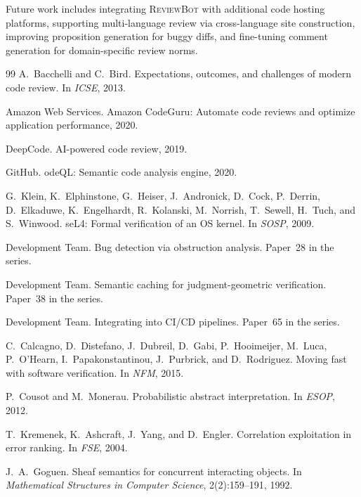 \documentclass[11pt]{article}
\newcommand{\ReviewBot}{\textsc{ReviewBot}}
\begin{document}
Future work includes integrating \ReviewBot{} with additional code hosting
platforms, supporting multi-language review via cross-language site
construction, improving proposition generation for buggy diffs, and
fine-tuning comment generation for domain-specific review norms.


\begin{thebibliography}{99}
A.~Bacchelli and C.~Bird.
\newblock Expectations, outcomes, and challenges of modern code review.
\newblock In \emph{ICSE}, 2013.

Amazon Web Services.
\newblock Amazon {C}ode{G}uru: Automate code reviews and optimize application
performance, 2020.

DeepCode.
\newblock AI-powered code review, 2019.

GitHub.
ode{QL}: Semantic code analysis engine, 2020.

G.~Klein, K.~Elphinstone, G.~Heiser, J.~Andronick, D.~Cock, P.~Derrin,
D.~Elkaduwe, K.~Engelhardt, R.~Kolanski, M.~Norrish, T.~Sewell, H.~Tuch,
and S.~Winwood.
\newblock se{L}4: Formal verification of an {OS} kernel.
\newblock In \emph{SOSP}, 2009.

\JuGeo{} Development Team.
\newblock Bug detection via obstruction analysis.
\newblock Paper~28 in the \JuGeo{} series.

\JuGeo{} Development Team.
\newblock Semantic caching for judgment-geometric verification.
\newblock Paper~38 in the \JuGeo{} series.

\JuGeo{} Development Team.
\newblock Integrating \JuGeo{} into CI/CD pipelines.
\newblock Paper~65 in the \JuGeo{} series.

C.~Calcagno, D.~Distefano, J.~Dubreil, D.~Gabi, P.~Hooimeijer,
M.~Luca, P.~O'Hearn, I.~Papakonstantinou, J.~Purbrick, and D.~Rodriguez.
\newblock Moving fast with software verification.
\newblock In \emph{NFM}, 2015.

P.~Cousot and M.~Monerau.
\newblock Probabilistic abstract interpretation.
\newblock In \emph{ESOP}, 2012.

T.~Kremenek, K.~Ashcraft, J.~Yang, and D.~Engler.
\newblock Correlation exploitation in error ranking.
\newblock In \emph{FSE}, 2004.

J.~A.~Goguen.
\newblock Sheaf semantics for concurrent interacting objects.
\newblock In \emph{Mathematical Structures in Computer Science},
2(2):159--191, 1992.


\end{thebibliography}
\end{document}
